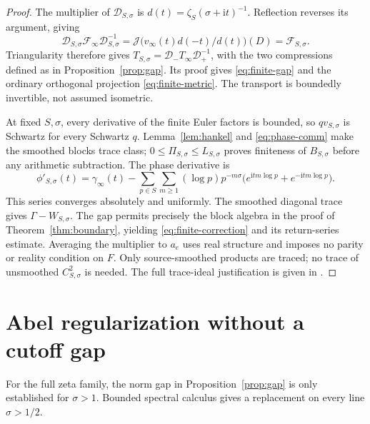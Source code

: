 \documentclass[11pt]{article}
\numberwithin{equation}{section}
\theoremstyle{definition}
\theoremstyle{remark}
\newcommand{\ii}{\mathrm i}
\newcommand{\J}{\mathcal J}
\newcommand{\Fcal}{\mathcal F}
\begin{document}
\begin{proof}
The multiplier of \(\mathcal D_{S,\sigma}\) is
\(d(t)=\zeta_S(\sigma+\ii t)^{-1}\). Reflection reverses its
argument, giving
\[
\mathcal D_{S,\sigma}\Fcal_\infty \mathcal D_{S,\sigma}^{-1}
=\J\bigl(v_\infty(t)d(-t)/d(t)\bigr)(D)
=\Fcal_{S,\sigma}.
\]
Triangularity therefore gives
\(T_{S,\sigma}=\mathcal D_-T_\infty\mathcal D_+^{-1}\), with the two
compressions defined as in Proposition~\ref{prop:gap}. Its proof gives
\eqref{eq:finite-gap} and the ordinary orthogonal projection
\eqref{eq:finite-metric}. The transport is boundedly invertible,
not assumed isometric.

At fixed \(S,\sigma\), every derivative of the finite Euler factors
is bounded, so \(qv_{S,\sigma}\) is Schwartz for every Schwartz \(q\).
Lemma~\ref{lem:hankel} and \eqref{eq:phase-comm} make the smoothed
blocks trace class; \(0\le\Pi_{S,\sigma}\le L_{S,\sigma}\)
proves finiteness of \(B_{S,\sigma}\) before any arithmetic subtraction.
The phase derivative is
\[
\phi'_{S,\sigma}(t)=\gamma_\infty(t)
-\sum_{p\in S}\sum_{m\ge1}(\log p)p^{-m\sigma}
\bigl(e^{\ii tm\log p}+e^{-\ii tm\log p}\bigr).
\]
This series converges absolutely and uniformly. The smoothed diagonal
trace gives \(\Gamma-W_{S,\sigma}\). The gap permits precisely the
block algebra in the proof of Theorem~\ref{thm:boundary}, yielding
\eqref{eq:finite-correction} and its return-series estimate. Averaging
the multiplier to \(a_e\) uses real structure and imposes no parity
or reality condition on \(F\). Only source-smoothed products are
traced; no trace of unsmoothed \(C_{S,\sigma}^2\) is needed.
The full trace-ideal justification is given in
\cite[Sections 2--4]{FiniteEulerNote}.
\end{proof}

\section{Abel regularization without a cutoff gap}\label{sec:abel}

For the full zeta family, the norm gap in
Proposition~\ref{prop:gap} is only established for \(\sigma>1\).
Bounded spectral calculus gives a replacement on every line
\(\sigma>1/2\).
\end{document}

